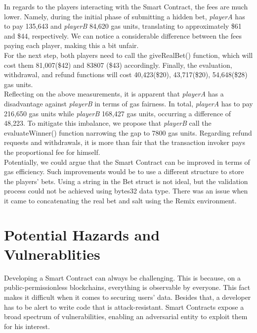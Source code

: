 \documentclass[12pt,a4paper]{article}
\begin{document}
In regards to the players interacting with the Smart Contract, the fees are much lower.
Namely, during the initial phase of submitting a hidden bet, \emph{playerA} has to pay 135,643
and \emph{playerB} 84,620 gas units, translating to approximately \$61 and \$44, respectively.
We can notice a considerable difference between the fees paying each player, making this a bit unfair. \\

For the next step, both players need to call the giveRealBet() function, which will cost
them 81,007(\$42) and  83807 (\$43) accordingly. Finally, the evaluation, withdrawal, and
refund functions will cost 40,423(\$20), 43,717(\$20), 54,648(\$28) gas units.  \\

Reflecting on the above measurements, it is apparent that \emph{playerA} has a disadvantage against \emph{playerB}
in terms of gas fairness. In total, \emph{playerA} has to pay 216,650 gas units while \emph{playerB} 168,427
gas units, occurring a difference of 48,223. To mitigate this imbalance, we propose that \emph{playerB}
call the evaluateWinner() function narrowing the gap to 7800 gas units. Regarding refund
requests and withdrawals, it is more than fair that the transaction invoker pays the proportional
fee for himself. \\

Potentially, we could argue that the Smart Contract can be improved in terms of gas efficiency.
Such improvements would be to use a different structure to store the players' bets. Using a string
in the Bet struct is not ideal, but the validation process could not be achieved using bytes32 data type.
There was an issue when it came to concatenating the real bet and salt using the Remix environment.

\section*{Potential Hazards and Vulnerablities}

Developing a Smart Contract can always be challenging. This is because, on a public-permissionless blockchains, everything is observable by everyone. This fact makes it difficult when it comes to securing users’ data. Besides that, a developer has to be alert to write code that is attack-resistant. Smart Contracts expose a broad spectrum of vulnerabilities, enabling an adversarial entity to exploit them for his interest.\\
\end{document}
